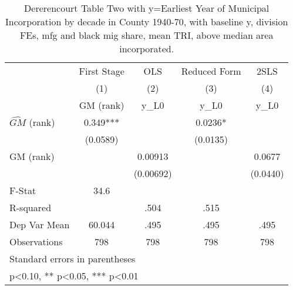 \begin{table}[htbp]\centering
\def\sym#1{\ifmmode^{#1}\else\(^{#1}\)\fi}
\caption{Dererencourt Table Two with y=Earliest Year of Municipal Incorporation by decade in County 1940-70, with baseline y, division FEs, mfg and black mig share, mean TRI, above median area incorporated.}
\begin{tabular}{l*{4}{c}}
\toprule
                    & First Stage   &         OLS   &Reduced Form   &        2SLS   \\
                    &\multicolumn{1}{c}{(1)}&\multicolumn{1}{c}{(2)}&\multicolumn{1}{c}{(3)}&\multicolumn{1}{c}{(4)}\\
                    &\multicolumn{1}{c}{GM  (rank)}&\multicolumn{1}{c}{y\_L0}&\multicolumn{1}{c}{y\_L0}&\multicolumn{1}{c}{y\_L0}\\
\midrule
$\hat{GM}$ (rank)   &       0.349***&               &      0.0236*  &               \\
                    &    (0.0589)   &               &    (0.0135)   &               \\
\addlinespace
GM  (rank)          &               &     0.00913   &               &      0.0677   \\
                    &               &   (0.00692)   &               &    (0.0440)   \\
\midrule
F-Stat              &        34.6   &               &               &               \\
R-squared           &               &        .504   &        .515   &               \\
Dep Var Mean        &      60.044   &        .495   &        .495   &        .495   \\
Observations        &         798   &         798   &         798   &         798   \\
\bottomrule
\multicolumn{5}{l}{\footnotesize Standard errors in parentheses}\\
\multicolumn{5}{l}{\footnotesize * p<0.10, ** p<0.05, *** p<0.01}\\
\end{tabular}
\end{table}
